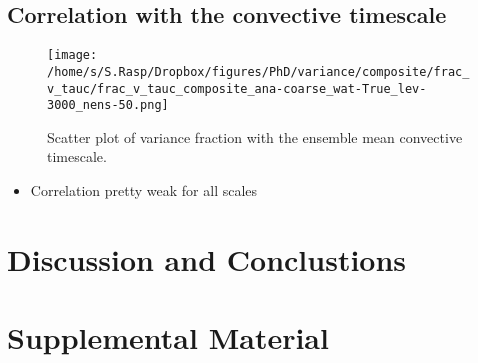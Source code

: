 \documentclass[a4paper, 12pt]{article}
\begin{document}
\newpage
\subsection{Correlation with the convective timescale}
\begin{figure}[h!]
\noindent \centering
\texttt{[image: /home/s/S.Rasp/Dropbox/figures/PhD/variance/composite/frac\_v\_tauc/frac\_v\_tauc\_composite\_ana-coarse\_wat-True\_lev-3000\_nens-50.png]}\\
\caption{Scatter plot of variance fraction with the ensemble mean convective timescale.} \label{fig:frac_v_tauc}
\end{figure}
\begin{itemize}
 \item Correlation pretty weak for all scales
\end{itemize}
\newpage

\section{Discussion and Conclustions}


\section{Supplemental Material}

\newpage

{\small
 }
 
\end{document}
